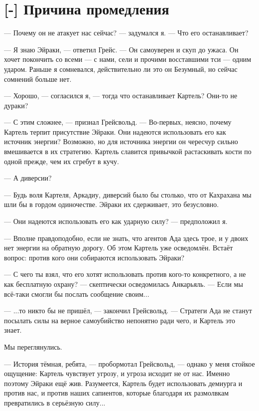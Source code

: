 \section{[-] Причина промедления}

\textspace

--- Почему он не атакует нас сейчас? --- задумался я.
--- Что его останавливает?

--- Я знаю Эйраки, --- ответил Грейс.
--- Он самоуверен и скуп до ужаса.
Он хочет покончить со всеми --- с нами, сели и прочими восставшими тси --- одним ударом.
Раньше я сомневался, действительно ли это он Безумный, но сейчас сомнений больше нет.

--- Хорошо, --- согласился я, --- тогда что останавливает Картель?
Они-то не дураки?

--- С этим сложнее, --- признал Грейсвольд.
--- Во-первых, неясно, почему Картель терпит присутствие Эйраки.
Они надеются использовать его как источник энергии?
Возможно, но для источника энергии он чересчур сильно вмешивается в их стратегию.
Картель славится привычкой растаскивать кости по одной прежде, чем их сгребут в кучу.

--- А диверсии?

--- Будь воля Картеля, Аркадиу, диверсий было бы столько, что от Кахрахана мы шли бы в гордом одиночестве.
Эйраки их сдерживает, это безусловно.

--- Они надеются использовать его как ударную силу? --- предположил я.

--- Вполне правдоподобно, если не знать, что агентов Ада здесь трое, и у двоих нет энергии на обратную дорогу.
Об этом Картель уже осведомлён.
Встаёт вопрос: против кого они собираются использовать Эйраки?

--- С чего ты взял, что его хотят использовать против кого-то конкретного, а не как бесплатную охрану? --- скептически осведомилась Анкарьяль.
--- Если мы всё-таки смогли бы послать сообщение своим...

--- ...то никто бы не пришёл, --- закончил Грейсвольд.
--- Стратеги Ада не станут посылать силы на верное самоубийство непонятно ради чего, и Картель это знает.

Мы переглянулись.

--- История тёмная, ребята, --- пробормотал Грейсвольд, --- однако у меня стойкое ощущение: Картель чувствует угрозу, и угроза исходит не от нас.
Именно поэтому Эйраки ещё жив.
Разумеется, Картель будет использовать демиурга и против нас, и против наших сапиентов, которые благодаря их размолвкам превратились в серьёзную силу...

